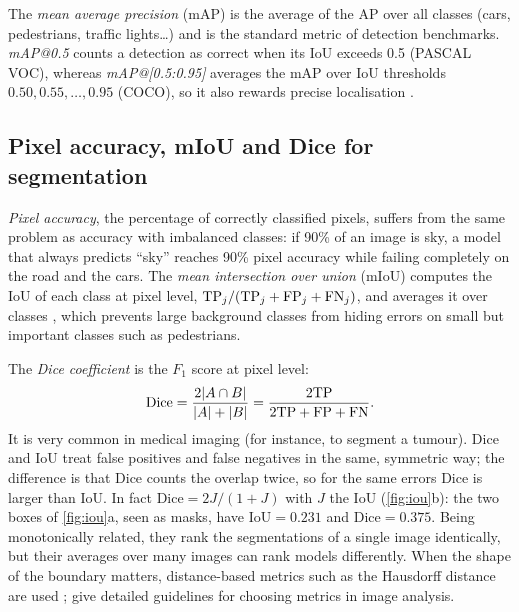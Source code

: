 The \emph{mean average precision} (mAP) is the average of the AP over all classes (cars,
pedestrians, traffic lights\dots) and is the standard metric of detection benchmarks.
\emph{mAP@0.5} counts a detection as correct when its IoU exceeds 0.5 (PASCAL VOC), whereas
\emph{mAP@[0.5:0.95]} averages the mAP over IoU thresholds $0.50,0.55,\dots,0.95$ (COCO), so it
also rewards precise localisation \citep{lin2014microsoft}.

\subsection{Pixel accuracy, mIoU and Dice for segmentation}

\emph{Pixel accuracy}, the percentage of correctly classified pixels, suffers from the same
problem as accuracy with imbalanced classes: if 90\% of an image is sky, a model that always
predicts ``sky'' reaches 90\% pixel accuracy while failing completely on the road and the cars.
The \emph{mean intersection over union} (mIoU) computes the IoU of each class at pixel level,
$\mathrm{TP}_j/(\mathrm{TP}_j+\mathrm{FP}_j+\mathrm{FN}_j)$, and averages it over classes \citep{long2015fully}, which prevents
large background classes from hiding errors on small but important classes such as
pedestrians.

The \emph{Dice coefficient} \citep{dice1945measures} is the $F_1$ score at pixel level:
\begin{equation}
  \mathrm{Dice}=\frac{2|A\cap B|}{|A|+|B|}=\frac{2\mathrm{TP}}{2\mathrm{TP}+\mathrm{FP}+\mathrm{FN}}.
\end{equation}
It is very common in medical imaging (for instance, to segment a tumour). Dice and IoU treat
false positives and false negatives in the same, symmetric way; the difference is that Dice
counts the overlap twice, so for the same errors Dice is larger than IoU. In fact
$\mathrm{Dice}=2J/(1+J)$ with $J$ the IoU (\cref{fig:iou}b): the two boxes of \cref{fig:iou}a,
seen as masks, have $\mathrm{IoU}=0.231$ and $\mathrm{Dice}=0.375$. Being monotonically related,
they rank the segmentations of a single image identically, but their averages over many images
can rank models differently. When the shape of the boundary matters, distance-based metrics such
as the Hausdorff distance are used \citep{taha2015metrics}; \citet{maierhein2024metrics} give
detailed guidelines for choosing metrics in image analysis.

